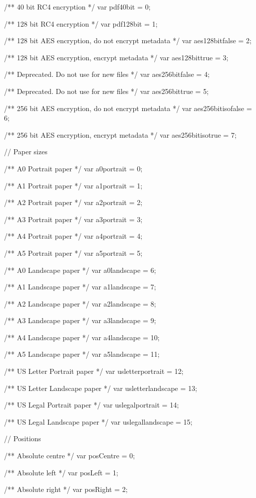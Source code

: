 /** 40 bit RC4 encryption */
var pdf40bit = 0;

/** 128 bit RC4 encryption */
var pdf128bit = 1;

/** 128 bit AES encryption, do not encrypt metadata */
var aes128bitfalse = 2;

/** 128 bit AES encryption, encrypt metadata */
var aes128bittrue = 3;

/** Deprecated. Do not use for new files */
var aes256bitfalse = 4;

/** Deprecated. Do not use for new files */
var aes256bittrue = 5;

/** 256 bit AES encryption, do not encrypt metadata */
var aes256bitisofalse = 6;

/** 256 bit AES encryption, encrypt metadata */
var aes256bitisotrue = 7;


// Paper sizes

/** A0 Portrait paper */
var a0portrait = 0;

/** A1 Portrait paper */
var a1portrait = 1;

/** A2 Portrait paper */
var a2portrait = 2;

/** A3 Portrait paper */
var a3portrait = 3;

/** A4 Portrait paper */
var a4portrait = 4;

/** A5 Portrait paper */
var a5portrait = 5;

/** A0 Landscape paper */
var a0landscape = 6;

/** A1 Landscape paper */
var a1landscape = 7;

/** A2 Landscape paper */
var a2landscape = 8;

/** A3 Landscape paper */
var a3landscape = 9;

/** A4 Landscape paper */
var a4landscape = 10;

/** A5 Landscape paper */
var a5landscape = 11;

/** US Letter Portrait paper */
var usletterportrait = 12;

/** US Letter Landscape paper */
var usletterlandscape = 13;

/** US Legal Portrait paper */
var uslegalportrait = 14;

/** US Legal Landscape paper */
var uslegallandscape = 15;


// Positions

/** Absolute centre */
var posCentre = 0;

/** Absolute left */
var posLeft = 1;

/** Absolute right */
var posRight = 2;


